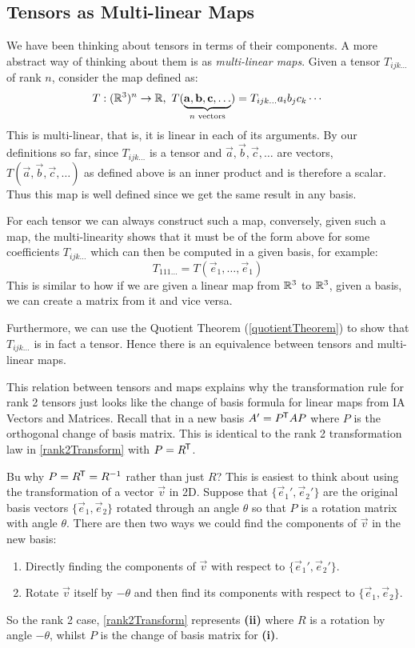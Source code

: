 \documentclass[../main.tex]{subfiles}
\begin{document}
\subsection{Tensors as Multi-linear Maps}
\nonexaminable
We have been thinking about tensors in terms of their components.
A more abstract way of thinking about them  is as \textit{multi-linear maps}.
Given a tensor $T_{ijk\ldots}$ of rank $n$, consider the map defined as:
\[
  T: (\mathbb{R}^3)^{n} \to \mathbb{R},\ T(\underbrace{\mathbf{\bm{a}}, \mathbf{\bm{b}}, \mathbf{\bm{c}}, \ldots}_{n \text{ vectors}}) = T_{ijk\ldots} a_ib_jc_k \cdots
\]
This is multi-linear, that is, it is linear in each of its arguments.
By our definitions so far, since $T_{ijk\ldots}$ is a tensor and $\vec{a}, \vec{b}, \vec{c}, \ldots$ are vectors, $T(\vec{a}, \vec{b}, \vec{c}, \ldots)$ as defined above is an inner product and is therefore a scalar.
Thus this map is well defined since we get the same result in any basis.

For each tensor we can always construct such a map, conversely, given such a map, the multi-linearity shows that it must be of the form above for some coefficients $T_{ijk\ldots}$ which can then be computed in a given basis, for example:
\[
  T_{111\ldots} = T(\vec{e}_1, \ldots, \vec{e}_1)
\]
This is similar to how if we are given a linear map from $\mathbb{R}^3$ to $\mathbb{R}^3$, given a basis, we can create a matrix from it and vice versa.

Furthermore, we can use the Quotient Theorem (\cref{quotientTheorem}) to show that $T_{ijk\ldots}$ is in fact a tensor.
Hence there is an equivalence between tensors and multi-linear maps.

This relation between tensors and maps explains why the transformation rule for rank 2 tensors just looks like the change of basis formula for linear maps from IA Vectors and Matrices.
Recall that in a new basis $A' = P^{{\mkern-1.5mu\mathsf{T}}} A P$ where $P$ is the orthogonal change of basis matrix.
This is identical to the rank 2 transformation law in \cref{rank2Transform} with $P = R^{{\mkern-1.5mu\mathsf{T}}}$.

Bu why $P = R^{{\mkern-1.5mu\mathsf{T}}} = R^{-1}$ rather than just $R$?
This is easiest to think about using the transformation of a vector $\vec{v}$ in 2D.
Suppose that $\{\vec{e}_1', \vec{e}_2'\}$ are the original basis vectors $\{\vec{e}_1, \vec{e}_2\}$ rotated through an angle $\theta$ so that $P$ is a rotation matrix with angle $\theta$.
There are then two ways we could find the components of $\vec{v}$ in the new basis:
\begin{enumerate}
  \item Directly finding the components of $\vec{v}$ with respect to $\{\vec{e}_1', \vec{e}_2'\}$.
  \item Rotate $\vec{v}$ itself by $-\theta$ and then find its components with respect to $\{\vec{e}_1, \vec{e}_2\}$.
\end{enumerate}
So the rank 2 case, \cref{rank2Transform} represents \textbf{(ii)} where $R$ is a rotation by angle $-\theta$, whilst $P$ is the change of basis matrix for \textbf{(i)}.
\end{document}
